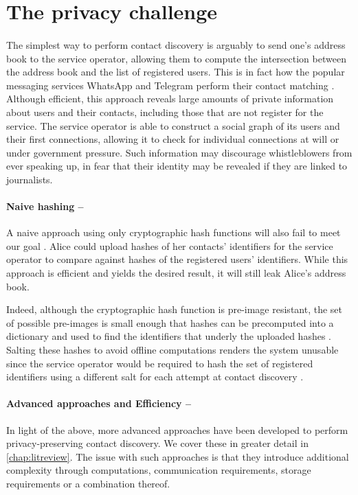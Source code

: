 \section{The privacy challenge}

\paragraph{} The simplest way to perform contact discovery is arguably to send one's address book to the service operator, allowing them to compute the intersection between the address book and the list of registered users. This is in fact how the popular messaging services WhatsApp and Telegram perform their contact matching \cite{Telegram,WhatsApp}. Although efficient, this approach reveals large amounts of private information about  users and their contacts, including those that are not register for the service. The service operator is able to construct a social graph of its users and their first connections, allowing it to check for individual connections at will or under government pressure. Such information may discourage whistleblowers from ever speaking up, in fear that their identity may be revealed if they are linked to journalists.


\paragraph{Naive hashing --}A naive approach using only cryptographic hash functions will also fail to meet our goal \cite{Kales19, Signal:Difficulty}. Alice could upload hashes of her contacts' identifiers for the service operator to compare against hashes of the registered users' identifiers. While this approach is efficient and yields the desired result, it will still leak Alice's address book.

Indeed, although the cryptographic hash function is pre-image resistant, the set of possible pre-images is small enough that hashes can be precomputed into a dictionary and used to find the identifiers that underly the uploaded hashes \cite{Signal:Difficulty}. Salting these hashes to avoid offline computations renders the system unusable since the service operator would be required to hash the set of registered identifiers using a different salt for each attempt at contact discovery \cite{Kales19}.

\paragraph{Advanced approaches and Efficiency --} In light of the above, more advanced approaches have been developed to perform privacy-preserving contact discovery. We cover these in greater detail in \autoref{chap:litreview}. The issue with such approaches is that they introduce additional complexity through computations, communication requirements, storage requirements or a combination thereof.

